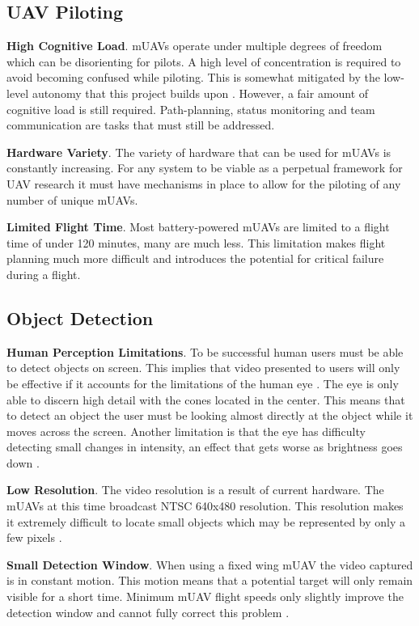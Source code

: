 \documentclass[12pt]{IEEEtran}
\begin{document}
\subsection{UAV Piloting}

\textbf{High Cognitive Load}.  mUAVs operate under multiple
degrees of freedom which can be disorienting for pilots.  A high level of
concentration is required to avoid becoming confused while piloting.  This is
somewhat mitigated by the low-level autonomy that this project builds upon
\cite{lin2010supporting}.  However, a fair amount of cognitive load is still
required.  Path-planning, status monitoring and team communication are tasks
that must still be addressed.

\textbf{Hardware Variety}.  The variety of hardware that can be used for mUAVs
is constantly increasing.  For any system to be viable as a perpetual framework
for UAV research it must have mechanisms in place to allow for the piloting of any number of unique mUAVs.

\textbf{Limited Flight Time}.  Most battery-powered mUAVs are limited to a
flight time of under 120 minutes, many are much less.  This limitation makes flight
planning much more difficult and introduces the potential for critical failure
during a flight.

\subsection{Object Detection}

\textbf{Human Perception Limitations}.  To be successful human
users must be able to detect objects on screen.  This implies that video presented to users
will only be effective if it accounts for the limitations of the human
eye \cite{humphrey2009human}. The eye is only able to discern high detail with
the cones located in the center.
This means that to detect an object the user must be looking almost directly at
the object while it moves across the screen.  Another limitation is that 
the eye has difficulty detecting small changes in intensity, an effect that gets
worse as brightness goes down \cite{gonzalezwoodsDIP}.

\textbf{Low Resolution}.  The video resolution is a result of
current hardware.  The mUAVs at this time broadcast NTSC 640x480 resolution. 
This resolution makes it extremely difficult to locate small objects which may be represented by only
a few pixels \cite{goodrich2009towards}.

\textbf{Small Detection Window}.  When using a fixed wing mUAV the video
captured is in constant motion.  This motion means that a potential target will
only remain visible for a short time.  Minimum mUAV flight speeds only slightly
improve the detection window and cannot fully correct this
problem \cite{goodrich2009towards}.
\end{document}
